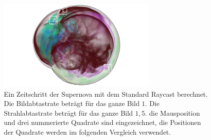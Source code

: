 \begin{figure}
	\centering
	\includegraphics[width=0.7\textwidth]{../../Neue_Messungen/Supernova/cut/st/st_123.png}
	\caption{Ein Zeitschritt der Supernova mit dem Standard Raycast berechnet. Die Bildabtastrate beträgt für das ganze Bild $1$. Die Strahlabtastrate beträgt für das ganze Bild $1,5$. die Mausposition und drei nummerierte Quadrate sind eingezeichnet, die Positionen der Quadrate werden im folgenden Vergleich verwendet.}
	\label{fig::res::sn_comp_st_123}
\end{figure}

